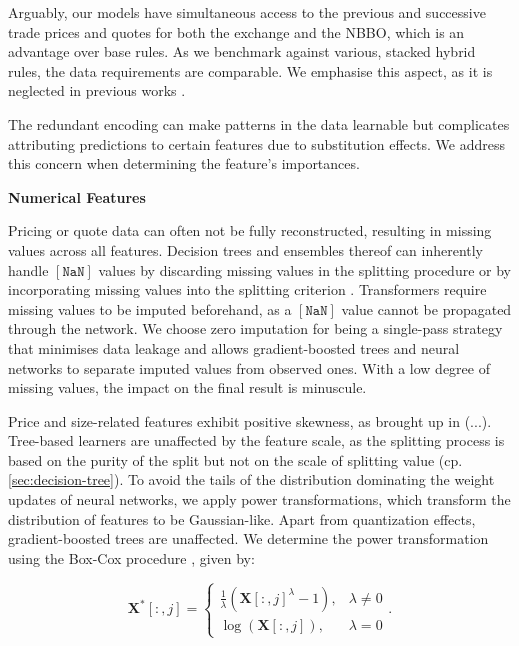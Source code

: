 Arguably, our models have simultaneous access to the previous and successive trade prices and quotes for both the exchange and the NBBO, which is an advantage over base rules. As we benchmark against various, stacked hybrid rules, the data requirements are comparable. We emphasise this aspect, as it is neglected in previous works \autocites[][485]{blazejewskiLocalNonParametricModel2005}[][48]{ronenMachineLearningTrade2022}[][9]{rosenthalModelingTradeDirection2012}.

The redundant encoding can make patterns in the data learnable but complicates attributing predictions to certain features due to substitution effects. We address this concern when determining the feature's importances.

\textbf{Numerical Features}

Pricing or quote data can often not be fully reconstructed, resulting in missing values across all features. Decision trees and ensembles thereof can inherently handle $\mathtt{[NaN]}$ values by discarding missing values in the splitting procedure \autocite[][150--152]{breimanClassificationRegressionTrees2017} or by incorporating missing values into the splitting criterion \autocite[][951]{twalaGoodMethodsCoping2008}. Transformers require missing values to be imputed beforehand, as a $\mathtt{[NaN]}$ value cannot be propagated through the network. We choose zero imputation for being a single-pass strategy that minimises data leakage and allows gradient-boosted trees and neural networks to separate imputed values from observed ones. With a low degree of missing values, the impact on the final result is minuscule.

Price and size-related features exhibit positive skewness, as brought up in (...). Tree-based learners are unaffected by the feature scale, as the splitting process is based on the purity of the split but not on the scale of splitting value (cp. \cref{sec:decision-tree}). To avoid the tails of the distribution dominating the weight updates of neural networks, we apply power transformations, which transform the distribution of features to be Gaussian-like. Apart from quantization effects, gradient-boosted trees are unaffected. We determine the power transformation using the Box-Cox procedure \autocite[][214]{boxAnalysisTransformations2022}, given by:

\begin{equation}
    \mathbf{X}^{*}\left[:,j\right]= \begin{cases}\frac{1}{\lambda}(\mathbf{X}\left[:,j\right]^\lambda-1), & \lambda \neq 0 \\ \log (\mathbf{X}\left[:,j\right]),& \lambda=0\end{cases}.
    \label{eq:box-cox-test}
\end{equation}

